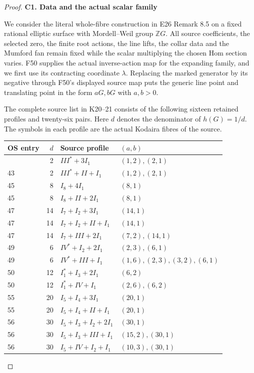 \begin{proof}
\par

\medskip\noindent\textbf{C1. Data and the actual scalar family}

\par\nobreak

We consider the literal whole-fibre construction in E26 Remark 8.5
on a fixed rational elliptic surface with Mordell--Weil group
\(\mathbb ZG\). All source coefficients, the selected zero, the
finite root actions, the line lifts, the collar data and the
Mumford fan remain fixed while the scalar multiplying the chosen
Hom section varies. F50 supplies the actual inverse-action map
for the expanding family, and we first use its contracting
coordinate \(\lambda\). Replacing the marked generator by its
negative through F50's displayed source map puts the generic
line point and translating point in the form \(aG,bG\) with
\(a,b>0\).

The complete source list in K20--21 consists of the following
sixteen retained profiles and twenty-six pairs. Here \(d\)
denotes the denominator of \(h(G)=1/d\). The symbols in each
profile are the actual Kodaira fibres of the source.

\begin{longtable}[]{@{}lrll@{}}
\toprule\noalign{}
OS entry & \(d\) & Source profile & \((a,b)\) \\
\midrule\noalign{}
\endhead
\bottomrule\noalign{}
\endlastfoot
43 & 2 & \(III^*+3I_1\) & \((1,2),(2,1)\) \\
43 & 2 & \(III^*+II+I_1\) & \((1,2),(2,1)\) \\
45 & 8 & \(I_8+4I_1\) & \((8,1)\) \\
45 & 8 & \(I_8+II+2I_1\) & \((8,1)\) \\
47 & 14 & \(I_7+I_2+3I_1\) & \((14,1)\) \\
47 & 14 & \(I_7+I_2+II+I_1\) & \((14,1)\) \\
47 & 14 & \(I_7+III+2I_1\) & \((7,2),(14,1)\) \\
49 & 6 & \(IV^*+I_2+2I_1\) & \((2,3),(6,1)\) \\
49 & 6 & \(IV^*+III+I_1\) & \((1,6),(2,3),(3,2),(6,1)\) \\
50 & 12 & \(I_1^*+I_3+2I_1\) & \((6,2)\) \\
50 & 12 & \(I_1^*+IV+I_1\) & \((2,6),(6,2)\) \\
55 & 20 & \(I_5+I_4+3I_1\) & \((20,1)\) \\
55 & 20 & \(I_5+I_4+II+I_1\) & \((20,1)\) \\
56 & 30 & \(I_5+I_3+I_2+2I_1\) & \((30,1)\) \\
56 & 30 & \(I_5+I_3+III+I_1\) & \((15,2),(30,1)\) \\
56 & 30 & \(I_5+IV+I_2+I_1\) & \((10,3),(30,1)\) \\
\end{longtable}


\end{proof}
